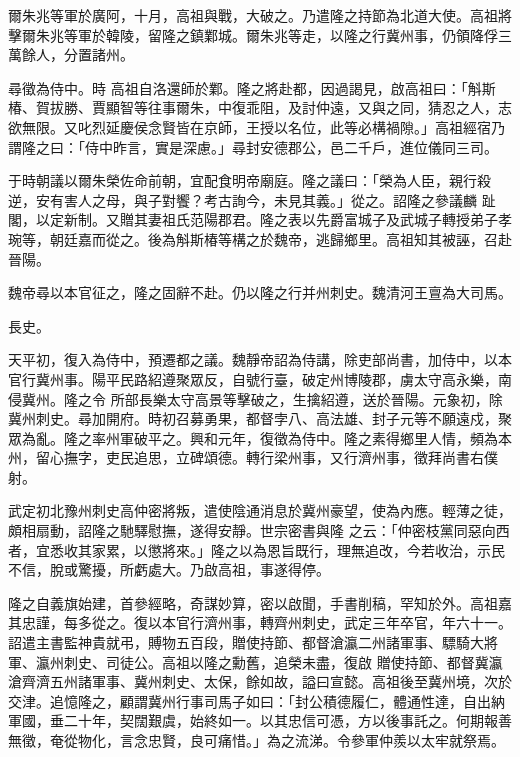 \begin{pinyinscope}
 爾朱兆等軍於廣阿，十月，高祖與戰，大破之。乃遣隆之持節為北道大使。高祖將擊爾朱兆等軍於韓陵，留隆之鎮鄴城。爾朱兆等走，以隆之行冀州事，仍領降俘三萬餘人，分置諸州。



 尋徵為侍中。時
 高祖自洛還師於鄴。隆之將赴都，因過謁見，啟高祖曰：「斛斯椿、賀拔勝、賈顯智等往事爾朱，中復乖阻，及討仲遠，又與之同，猜忍之人，志欲無限。又叱烈延慶侯念賢皆在京師，王授以名位，此等必構禍隙。」高祖經宿乃謂隆之曰：「侍中昨言，實是深慮。」尋封安德郡公，邑二千戶，進位儀同三司。



 于時朝議以爾朱榮佐命前朝，宜配食明帝廟庭。隆之議曰：「榮為人臣，親行殺逆，安有害人之母，與子對饗？考古詢今，未見其義。」從之。詔隆之參議麟
 趾閣，以定新制。又贈其妻祖氏范陽郡君。隆之表以先爵富城子及武城子轉授弟子孝琬等，朝廷嘉而從之。後為斛斯椿等構之於魏帝，逃歸鄉里。高祖知其被誣，召赴晉陽。



 魏帝尋以本官征之，隆之固辭不赴。仍以隆之行并州刺史。魏清河王亶為大司馬。



 長史。



 天平初，復入為侍中，預遷都之議。魏靜帝詔為侍講，除吏部尚書，加侍中，以本官行冀州事。陽平民路紹遵聚眾反，自號行臺，破定州博陵郡，虜太守高永樂，南侵冀州。隆之令
 所部長樂太守高景等擊破之，生擒紹遵，送於晉陽。元象初，除冀州刺史。尋加開府。時初召募勇果，都督孛八、高法雄、封子元等不願遠戍，聚眾為亂。隆之率州軍破平之。興和元年，復徵為侍中。隆之素得鄉里人情，頻為本州，留心撫字，吏民追思，立碑頌德。轉行梁州事，又行濟州事，徵拜尚書右僕射。



 武定初北豫州刺史高仲密將叛，遣使陰通消息於冀州豪望，使為內應。輕薄之徒，頗相扇動，詔隆之馳驛慰撫，遂得安靜。世宗密書與隆
 之云：「仲密枝黨同惡向西者，宜悉收其家累，以懲將來。」隆之以為恩旨既行，理無追改，今若收治，示民不信，脫或驚擾，所虧處大。乃啟高祖，事遂得停。



 隆之自義旗始建，首參經略，奇謀妙算，密以啟聞，手書削稿，罕知於外。高祖嘉其忠謹，每多從之。復以本官行濟州事，轉齊州刺史，武定三年卒官，年六十一。詔遣主書監神貴就弔，賻物五百段，贈使持節、都督滄瀛二州諸軍事、驃騎大將軍、瀛州刺史、司徒公。高祖以隆之勳舊，追榮未盡，復啟
 贈使持節、都督冀瀛滄齊濟五州諸軍事、冀州刺史、太保，餘如故，謚曰宣懿。高祖後至冀州境，次於交津。追憶隆之，顧謂冀州行事司馬子如曰：「封公積德履仁，體通性達，自出納軍國，垂二十年，契闊艱虞，始終如一。以其忠信可憑，方以後事託之。何期報善無徵，奄從物化，言念忠賢，良可痛惜。」為之流涕。令參軍仲羨以太牢就祭焉。




\end{pinyinscope}
